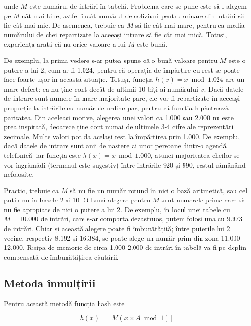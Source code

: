 unde $M$ este numărul de intrări în tabelă. Problema care se pune este să-l
alegem pe $M$ cât mai bine, astfel încât numărul de coliziuni pentru oricare
din intrări să fie cât mai mic. De asemenea, trebuie ca $M$ să fie cât mai
mare, pentru ca media numărului de chei repartizate la aceeași intrare să fie
cât mai mică. Totuși, experiența arată că nu orice valoare a lui $M$ este
bună.

De exemplu, la prima vedere s-ar putea spune că o bună valoare pentru $M$ este
o putere a lui 2, cum ar fi 1.024, pentru că operația de împărțire cu rest se
poate face foarte ușor în această situație. Totuși, funcția $h(x)=x \bmod
1.024$ are un mare defect: ea nu ține cont decât de ultimii 10 biți ai
numărului $x$. Dacă datele de intrare sunt numere în mare majoritate pare, ele
vor fi repartizate în aceeași proporție la intrările cu număr de ordine par,
pentru că funcția h păstrează paritatea. Din aceleași motive, alegerea unei
valori ca 1.000 sau 2.000 nu este prea inspirată, deoarece ține cont numai de
ultimele 3-4 cifre ale reprezentării zecimale. Multe valori pot da același
rest la împărțirea prin 1.000. De exemplu, dacă datele de intrare sunt anii de
naștere ai unor persoane dintr-o agendă telefonică, iar funcția este $h(x)=x
\bmod 1.000$, atunci majoritatea cheilor se vor îngrămădi (termenul este
sugestiv) între intrările 920 și 990, restul rămânând nefolosite.

Practic, trebuie ca $M$ să nu fie un număr rotund în nici o bază aritmetică,
sau cel puțin nu în bazele 2 și 10. O bună alegere pentru $M$ sunt numerele
prime care să nu fie apropiate de nici o putere a lui 2. De exemplu, în locul
unei tabele cu $M=10.000$ de intrări, care s-ar comporta dezastruos, putem
folosi una cu 9.973 de intrări. Chiar și această alegere poate fi
îmbunătățită; între puterile lui 2 vecine, respectiv 8.192 și 16.384, se poate
alege un număr prim din zona 11.000-12.000. Risipa de memorie de circa
1.000-2.000 de intrări în tabelă va fi pe deplin compensată de îmbunătățirea
căutării.

\subsection{Metoda înmulțirii}

Pentru această metodă funcția hash este

\begin{equation}
  h(x) = \lfloor M(x \times A \bmod 1) \rfloor
\end{equation}

